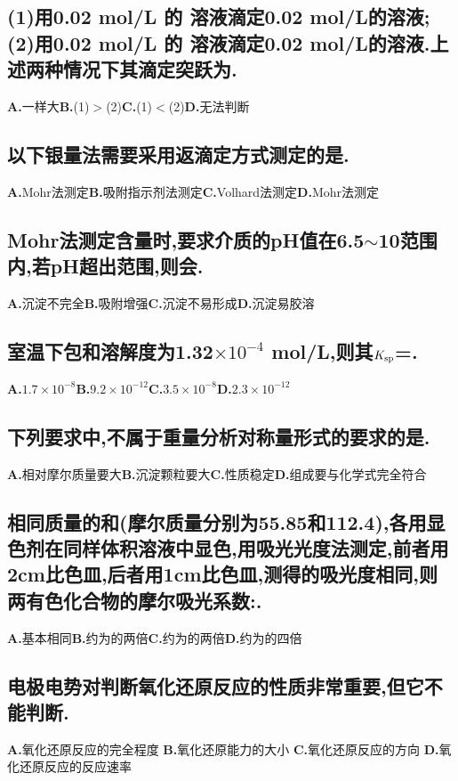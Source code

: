 \documentclass[UTF8]{article}
\newcommand{\shortline}{\underline{\hspace{1cm}}}
\newcommand{\bfA}{\textbf{A.}}
\newcommand{\bfB}{\qquad \textbf{B.}}
\newcommand{\bfC}{\qquad \textbf{C.}}
\newcommand{\bfD}{\qquad \textbf{D.}}
\newcommand{\indLarge}{\hspace{-0.6cm}}
\begin{document}
    \subsection{(1)用0.02 mol/L 的 溶液滴定0.02 mol/L的溶液;(2)用0.02 mol/L 的 溶液滴定0.02 mol/L的溶液.上述两种情况下其滴定突跃为\shortline.}
    \bfA 一样大\bfB (1)$>$(2)\bfC (1)$<$(2)\bfD 无法判断

    \subsection{以下银量法需要采用返滴定方式测定的是\shortline.}
    \bfA Mohr法测定\bfB 吸附指示剂法测定\bfC Volhard法测定\bfD Mohr法测定

    \subsection{Mohr法测定含量时,要求介质的pH值在6.5$\sim$10范围内,若pH超出范围,则会\shortline.}
    \bfA {}沉淀不完全\bfB {}吸附增强\bfC {}沉淀不易形成\bfD {}沉淀易胶溶

    \subsection{室温下包和溶解度为1.32$\times 10^{-4}$ mol/L,则其$K_{\ce{sp}}$=\shortline.}
    \bfA $1.7\times 10^{-8}$\bfB $9.2\times 10^{-12}$\bfC $3.5\times 10^{-8}$\bfD $2.3\times 10^{-12}$

    \subsection{下列要求中,不属于重量分析对称量形式的要求的是\shortline.}
    \bfA 相对摩尔质量要大\bfB 沉淀颗粒要大\bfC 性质稳定\bfD 组成要与化学式完全符合

    \subsection{相同质量的和(摩尔质量分别为55.85和112.4),各用显色剂在同样体积溶液中显色,用吸光光度法测定,前者用2cm比色皿,后者用1cm比色皿,测得的吸光度相同,则两有色化合物的摩尔吸光系数:\shortline.}
    \bfA 基本相同\bfB {}约为的两倍\bfC {}约为的两倍\bfD {}约为的四倍

    \subsection{电极电势对判断氧化还原反应的性质非常重要,但它不能判断\shortline.}
        \indLarge \bfA 氧化还原反应的完全程度
        \indLarge \bfB 氧化还原能力的大小
        \indLarge \bfC 氧化还原反应的方向
        \indLarge \bfD 氧化还原反应的反应速率
\end{document}
